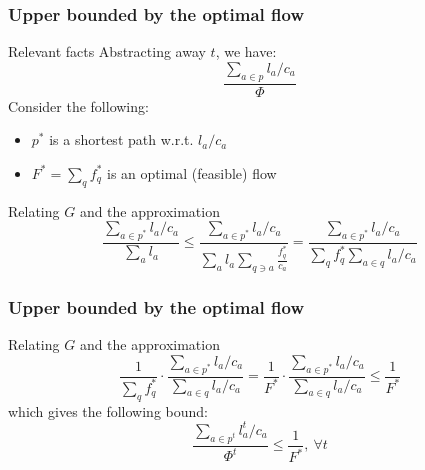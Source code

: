\documentclass{beamer}
\begin{document}
\begin{frame}
    \frametitle{Upper bounded by the optimal flow}

    \begin{block}{Relevant facts}
        Abstracting away $t$, we have:
        \begin{equation*}
            \frac{\sum_{a\in p} l_a / c_a}{\Phi}
        \end{equation*}
        Consider the following:
        \begin{itemize}
            \item $p^*$ is a shortest path w.r.t. $l_a / c_a$
            \item $F^* = \sum_q f_q^*$ is an optimal (feasible) flow
        \end{itemize}
    \end{block}
    
    \begin{block}{Relating $G$ and the approximation}
\begin{equation*}
\dfrac{\sum_{a \in p^*} l_a / c_a}{\sum_a l_a}
\leq
\dfrac{\sum_{a \in p^*} l_a / c_a}
{\sum_a l_a \sum_{q\ni a} \frac{f_q^*}{c_a}}
=
\dfrac{\sum_{a \in p^*} l_a / c_a}
{\sum_q f_q^* \sum_{a\in q} l_a / c_a}
\end{equation*}
    \end{block}

\end{frame}

\begin{frame}
    \frametitle{Upper bounded by the optimal flow}

    
    \begin{block}{Relating $G$ and the approximation}
\begin{equation*}
\dfrac{1}{ \sum_{q} f_q^*}
\cdot
\dfrac{\sum_{a \in p^*} l_a / c_a}
{\sum_{a\in q} l_a / c_a}
=
\dfrac{1}{F^*}
\cdot
\dfrac{\sum_{a \in p^*} l_a / c_a}
{\sum_{a\in q} l_a / c_a}
\leq
\dfrac{1}{F^*}
\end{equation*}
which gives the following bound:
\begin{equation*}
\dfrac{\sum_{a \in p^t} l_a^t / c_a}{\Phi^t}
\leq
\dfrac{1}{F^*},~\forall t \label{bound}
\end{equation*}
    \end{block}

\end{frame}
\end{document}
